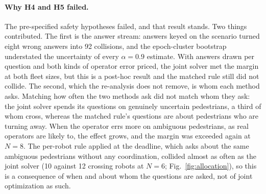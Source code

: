 \documentclass[a4paper,fleqn]{cas-dc}
\begin{document}
\paragraph{Why H4 and H5 failed.} The pre-specified safety hypotheses failed, and that result stands. Two things contributed. The first is the answer stream: answers keyed on the scenario turned eight wrong answers into 92 collisions, and the epoch-cluster bootstrap understated the uncertainty of every $\alpha = 0.9$ estimate. With answers drawn per question and both kinds of operator error priced, the joint solver met the margin at both fleet sizes, but this is a post-hoc result and the matched rule still did not collide. The second, which the re-analysis does not remove, is whom each method asks. Matching how often the two methods ask did not match whom they ask: the joint solver spends its questions on genuinely uncertain pedestrians, a third of whom cross, whereas the matched rule's questions are about pedestrians who are turning away. When the operator errs more on ambiguous pedestrians, as real operators are likely to, the effect grows, and the margin was exceeded again at $N = 8$. The per-robot rule applied at the deadline, which asks about the same ambiguous pedestrians without any coordination, collided almost as often as the joint solver (10 against 12 crossing robots at $N = 6$; Fig.~\ref{fig:allocation}), so this is a consequence of when and about whom the questions are asked, not of joint optimization as such.
\end{document}
